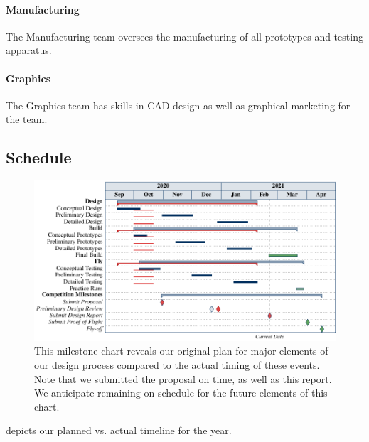 \documentclass[report]{byu-aero}
\begin{document}
\paragraph{Manufacturing} The Manufacturing team oversees the manufacturing of all prototypes and testing apparatus.
\paragraph{Graphics} The Graphics team has skills in CAD design as well as graphical marketing for the team. 


\subsection{Schedule}
\label{ssec:Schedule}


\begin{figure}[h!]
	\centering
	\includegraphics[]{milestonechart_dr.pdf}
	\caption{This milestone chart reveals our {\color{\BYUblue} original plan} for major elements of our design process compared to the  {\color{\BYUred} actual timing} of these events.  Note that we submitted the proposal on time, as well as this report.  We anticipate remaining on schedule for the {\color{\BYUgreen} future elements} of this chart.}
	\label{fig:plannedvsactualtiming}
\end{figure}

 depicts our planned vs. actual timeline for the year.
 \lipsum[2]



\end{document}
